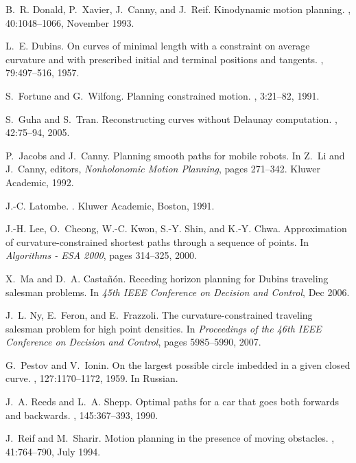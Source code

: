 \documentclass[a4paper]{article}
\begin{document}
\begin{thebibliography}{10}
B.~R. Donald, P.~Xavier, J.~Canny, and J.~Reif.
\newblock Kinodynamic motion planning.
, 40:1048--1066, November 1993.

L.~E. Dubins.
\newblock On curves of minimal length with a constraint on average curvature
  and with prescribed initial and terminal positions and tangents.
, 79:497--516, 1957.

S.~Fortune and G.~Wilfong.
\newblock Planning constrained motion.
, 3:21--82,
  1991.

S.~Guha and S.~Tran.
\newblock Reconstructing curves without {Delaunay} computation.
, 42:75--94, 2005.

P.~Jacobs and J.~Canny.
\newblock Planning smooth paths for mobile robots.
\newblock In Z.~Li and J.~Canny, editors, {\em Nonholonomic Motion Planning},
  pages 271--342. Kluwer Academic, 1992.

J.-C. Latombe.
.
\newblock Kluwer Academic, Boston, 1991.

J.-H. Lee, O.~Cheong, W.-C. Kwon, S.-Y. Shin, and K.-Y. Chwa.
\newblock Approximation of curvature-constrained shortest paths through a
  sequence of points.
\newblock In {\em Algorithms - ESA 2000}, pages 314--325, 2000.

X.~Ma and D.~A. Casta{\~n}{\'o}n.
\newblock Receding horizon planning for {D}ubins traveling salesman problems.
\newblock In {\em 45th IEEE Conference on Decision and Control}, Dec 2006.

J.~L. Ny, E.~Feron, and E.~Frazzoli.
\newblock The curvature-constrained traveling salesman problem for high point
  densities.
\newblock In {\em Proceedings of the 46th IEEE Conference on Decision and
  Control}, pages 5985--5990, 2007.

G.~Pestov and V.~Ionin.
\newblock On the largest possible circle imbedded in a given closed curve.
, 127:1170--1172, 1959.
\newblock In Russian.

J.~A. Reeds and L.~A. Shepp.
\newblock Optimal paths for a car that goes both forwards and backwards.
, 145:367--393, 1990.

J.~Reif and M.~Sharir.
\newblock Motion planning in the presence of moving obstacles.
, 41:764--790, July 1994.


\end{thebibliography}
\end{document}
